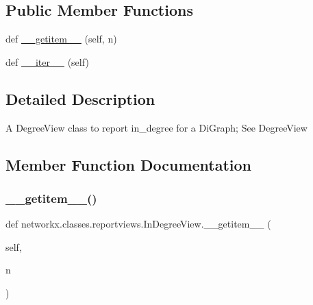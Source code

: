 \subsection*{Public Member Functions}
\begin{DoxyCompactItemize}
\item 
def \hyperlink{classnetworkx_1_1classes_1_1reportviews_1_1InDegreeView_aa0e673863d3acdf8d87f5d25c95427a3}{\+\_\+\+\_\+getitem\+\_\+\+\_\+} (self, n)
\item 
def \hyperlink{classnetworkx_1_1classes_1_1reportviews_1_1InDegreeView_a4b8f387220e76c2d985cfede049da404}{\+\_\+\+\_\+iter\+\_\+\+\_\+} (self)
\end{DoxyCompactItemize}


\subsection{Detailed Description}
\begin{DoxyVerb}A DegreeView class to report in_degree for a DiGraph; See DegreeView\end{DoxyVerb}
 

\subsection{Member Function Documentation}
\mbox{\label{classnetworkx_1_1classes_1_1reportviews_1_1InDegreeView_aa0e673863d3acdf8d87f5d25c95427a3}} 
\subsubsection{\texorpdfstring{\+\_\+\+\_\+getitem\+\_\+\+\_\+()}{\_\_getitem\_\_()}}
{\footnotesize\ttfamily def networkx.\+classes.\+reportviews.\+In\+Degree\+View.\+\_\+\+\_\+getitem\+\_\+\+\_\+ (\begin{DoxyParamCaption}\item[{}]{self,  }\item[{}]{n }\end{DoxyParamCaption})}

